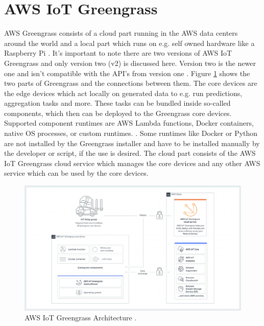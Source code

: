 \newpage
\section{AWS IoT Greengrass}
\gls{AWS} Greengrass consists of a cloud part running in the \gls{AWS} data centers around the world and a local part which runs on e.g. self owned hardware like a Raspberry Pi \cite{AmazonWebServicesHowItWorks}. It's important to note there are two versions of AWS IoT Greengrass and only version two (v2) is discussed here. Version two is the newer one and isn't compatible with the API's from version one \cite{aws-greengrass-guide}. Figure \ref{fig:aws-greengrass-how-it-works} shows the two parts of Greengrass and the connections between them. The core devices are the edge devices which act locally on generated data to e.g. run predictions, aggregation tasks and more. These tasks can be bundled inside so-called components, which then can be deployed to the Greengrass core devices. Supported component runtimes are AWS Lambda functions, Docker containers, native OS processes, or custom runtimes. \cite{AmazonWebServicesHowItWorks}. Some runtimes like Docker or Python are not installed by the Greengrass installer and have to be installed manually by the developer or script, if the use is desired. The cloud part consists of the AWS IoT Greengrass cloud service which manages the core devices and any other AWS service which can be used by the core devices.

\begin{figure}[H]
    \centering
    \includegraphics[width=\textwidth]{assets/aws-greengrass/aws-greengrass-how-it-works.png}
    \caption{AWS IoT Greengrass Architecture \cite{AmazonWebServicesHowItWorks}.}\label{fig:aws-greengrass-how-it-works}
\end{figure}

